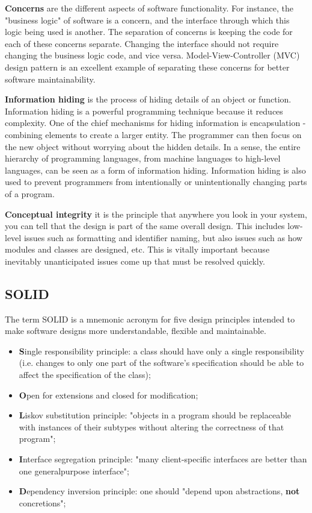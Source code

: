 \documentclass{article}
\begin{document}
			\bigskip
			\textbf{Concerns} are the different aspects of software functionality. For instance, the "business logic" of software is a concern, and the interface through which this logic being used is another. The separation of concerns is keeping the code for each of these concerns separate. Changing the interface should not require changing the business logic code, and vice versa. Model-View-Controller (MVC) design pattern is an excellent example of separating these concerns for better software maintainability.

			\textbf{Information hiding} is the process of hiding details of an object or function. Information hiding is a powerful programming technique because it reduces complexity. One of the chief  mechanisms for hiding information is encapsulation - combining elements to create a larger entity. The programmer can then focus on the new object without worrying about the hidden details. In a sense, the entire hierarchy of programming languages, from machine languages to high-level languages, can be seen as a form of information hiding. Information hiding is also used to prevent programmers from intentionally or unintentionally changing parts of a program.

			\textbf{Conceptual integrity} it is the principle that anywhere you look in your system, you can tell that the design is part of the same overall design. This includes low-level issues such as formatting and identifier naming, but also issues such as how modules and classes are designed, etc. This is vitally important because inevitably unanticipated issues come up that must be resolved quickly.


		\subsection{SOLID}
			The term SOLID is a mnemonic acronym for five design principles intended to make software designs more understandable, flexible and maintainable.
			\begin{itemize}
				\item \textbf{S}ingle responsibility principle: a class should have only a single responsibility (i.e. changes to only one part of the software’s specification should be able to affect the specification of the class);
				\item \textbf{O}pen for extensions and closed for modification;
				\item \textbf{L}iskov substitution principle: "objects in a program should be replaceable with instances of their subtypes without altering the correctness of that program";
				\item \textbf{I}nterface segregation principle: "many client-specific interfaces are better than one generalpurpose interface";
				\item \textbf{D}ependency inversion principle: one should "depend upon abstractions, \textbf{not} concretions";
			\end{itemize}
\end{document}
